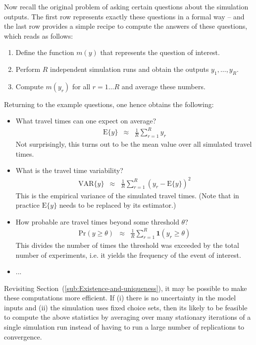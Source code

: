 Now recall the original problem of asking certain questions about
the simulation outputs. The first row 
represents exactly these questions in a formal way -- and the last
row  provides a simple recipe to compute
the answers of these questions, which reads as follows:
\begin{enumerate}
\item Define the function $m(y)$ that represents the question of interest.
\item Perform $R$ independent simulation runs and obtain the outputs $y_{1},\ldots,y_{R}$.
\item Compute $m(y_{r})$ for all $r=1\ldots R$ and average these numbers.
\end{enumerate}
Returning to the example questions, one hence obtains the following:
\begin{itemize}
\item What travel times can one expect on average?
\begin{eqnarray}
\text{E}\{y\} & \approx & \frac{1}{R}\sum_{r=1}^{R}y_{r}
\end{eqnarray}
Not surprisingly, this turns out to be the mean value over all simulated
travel times.
\item What is the travel time variability?
\begin{eqnarray}
\text{VAR}\{y\} & \approx & \frac{1}{R}\sum_{r=1}^{R}(y_{r}-\text{E}\{y\})^{2}
\end{eqnarray}
This is the empirical variance of the simulated travel times. (Note
that in practice $\text{E}\{y\}$ needs to be replaced by its estimator.)
\item How probable are travel times beyond some threshold $\theta$?
\begin{eqnarray}
\text{Pr}(y\geq\theta) & \approx & \frac{1}{R}\sum_{r=1}^{R}\mathbf{1}(y_{r}\geq\theta)
\end{eqnarray}
This divides the number of times the threshold was exceeded by the
total number of experiments, i.e. it yields the frequency of the event
of interest.
\item ...
\end{itemize}
Revisiting Section~(\ref{sub:Existence-and-uniqueness}), it may
be possible to make these computations more efficient. If (i) there
is no uncertainty in the model inputs and (ii) the simulation uses
fixed choice sets, then its likely to be feasible to compute the above
statistics by averaging over many stationary iterations of a single
simulation run instead of having to run a large number of replications
to convergence. 

